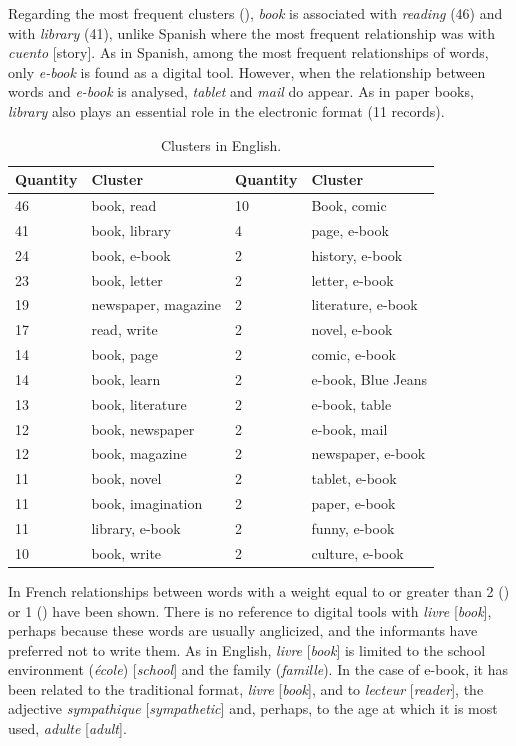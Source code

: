 \documentclass[english]{textolivre}
\begin{document}
Regarding the most frequent clusters (), \textit{book} is associated with \textit{reading} (46) and with \textit{library} (41), unlike Spanish where the most frequent relationship was with \textit{cuento} [story]. As in Spanish, among the most frequent relationships of words, only \textit{e-book} is found as a digital tool. However, when the relationship between words and \textit{e-book} is analysed, \textit{tablet} and \textit{mail} do appear. As in paper books, \textit{library} also plays an essential role in the electronic format (11 records).

\begin{table}[h!]
\centering
\begin{threeparttable}
\caption{Clusters in English.}
\label{tab06}
\begin{tabular}{l l l l}
\toprule
 \textbf{Quantity} & \textbf{Cluster} & \textbf{Quantity} & \textbf{Cluster} \\
 \midrule
46 & book, read & 10 & Book, comic \\
41 & book, library & 4 & page, e-book \\
24 & book, e-book & 2 & history, e-book \\
23 & book, letter & 2 & letter, e-book \\
19 & newspaper, magazine & 2 & literature, e-book \\
17 & read, write & 2 & novel, e-book \\
14 & book, page & 2 & comic, e-book \\
14 & book, learn & 2 & e-book, Blue Jeans \\
13 & book, literature & 2 & e-book, table \\
12 & book, newspaper & 2 & e-book, mail \\
12 & book, magazine & 2 & newspaper, e-book \\
11 & book, novel & 2 & tablet, e-book \\
11 & book, imagination & 2 & paper, e-book \\
11 & library, e-book & 2 & funny, e-book \\
10 & book, write & 2 & culture, e-book \\
\bottomrule
\end{tabular}
\end{threeparttable}
\end{table}

In French relationships between words with a weight equal to or greater than 2 () or 1 () have been shown. There is no reference to digital tools with \textit{livre} [\textit{book}], perhaps because these words are usually anglicized, and the informants have preferred not to write them. As in English, \textit{livre} [\textit{book}] is limited to the school environment (\textit{école}) [\textit{school}] and the family (\textit{famille}). In the case of e-book, it has been related to the traditional format, \textit{livre} [\textit{book}], and to \textit{lecteur} [\textit{reader}], the adjective \textit{sympathique} [\textit{sympathetic}] and, perhaps, to the age at which it is most used, \textit{adulte} [\textit{adult}].
\end{document}

